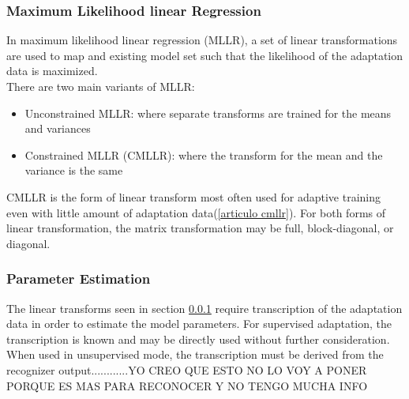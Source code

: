 \subsubsection{Maximum Likelihood linear Regression}\label{mllr}
In maximum likelihood linear regression (MLLR), a set of linear transformations are used to map and existing model set such that the likelihood of the adaptation data is maximized.\\
There are two main variants of MLLR:
\begin{itemize}
	\item Unconstrained MLLR: where separate transforms are trained for the means and variances
	\item Constrained MLLR (CMLLR): where the transform for the mean and the variance is the same
\end{itemize}
CMLLR is the form of linear transform most often used for adaptive training even with little amount of adaptation data(\ref{articulo cmllr}). For both forms of linear transformation, the matrix transformation may be full, block-diagonal, or diagonal.
\subsubsection{Parameter Estimation}\label{pe}
The linear transforms seen in section \ref{mllr}  require transcription of the adaptation data in order to estimate the model parameters. For supervised adaptation, the transcription is known and may be directly used without further consideration. When used in unsupervised mode, the transcription must be derived from the recognizer output............YO CREO QUE ESTO NO LO VOY A PONER PORQUE ES MAS PARA RECONOCER Y NO TENGO MUCHA INFO
